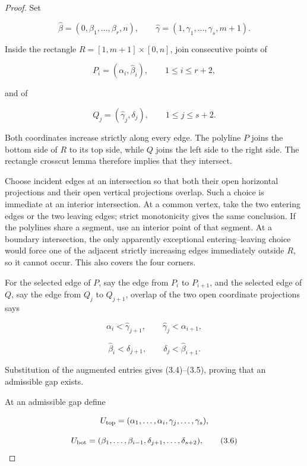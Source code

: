 \documentclass[11pt]{article}
\numberwithin{equation}{section}
\begin{document}
\begin{proof}

Set

\nopagebreak[4]
\[
\widehat\beta=(0,\beta_1,\ldots,\beta_r,n),
\qquad
\widehat\gamma=(1,\gamma_1,\ldots,\gamma_s,m+1).
\]

Inside the rectangle $R=[1,m+1]\times[0,n]$, join consecutive points of

\nopagebreak[4]
\[
P_i=(\alpha_i,\widehat\beta_i),\qquad 1\leq i\leq r+2,
\]

and of

\nopagebreak[4]
\[
Q_j=(\widehat\gamma_j,\delta_j),\qquad 1\leq j\leq s+2.
\]

Both coordinates increase strictly along every edge. The polyline $P$ joins the
bottom side of $R$ to its top side, while $Q$ joins the left side to the right
side. The rectangle crosscut lemma therefore implies that they intersect.

Choose incident edges at an intersection so that both their open horizontal
projections and their open vertical projections overlap. Such a choice is
immediate at an interior intersection. At a common vertex, take the two entering
edges or the two leaving edges; strict monotonicity gives the same conclusion.
If the polylines share a segment, use an interior point of that segment. At a
boundary intersection, the only apparently exceptional entering--leaving choice
would force one of the adjacent strictly increasing edges immediately outside
$R$, so it cannot occur. This also covers the four corners.

For the selected edge of $P$, say the edge from $P_i$ to $P_{i+1}$, and the
selected edge of $Q$, say the edge from $Q_j$ to $Q_{j+1}$, overlap of the two
open coordinate projections says

\nopagebreak[4]
\[
\alpha_i<\widehat\gamma_{j+1},\qquad
\widehat\gamma_j<\alpha_{i+1},
\]

\nopagebreak[4]
\[
\widehat\beta_i<\delta_{j+1},\qquad
\delta_j<\widehat\beta_{i+1}.
\]

Substitution of the augmented entries gives (3.4)--(3.5), proving that an
admissible gap exists.

At an admissible gap define

\nopagebreak[4]
\[
U_{\rm top}=(\alpha_1,\ldots,\alpha_i,
              \gamma_j,\ldots,\gamma_s),
\]

\nopagebreak[4]
\[
U_{\rm bot}=(\beta_1,\ldots,\beta_{i-1},
              \delta_{j+1},\ldots,\delta_{s+2}),
\tag{3.6}
\]


\end{proof}
\end{document}
